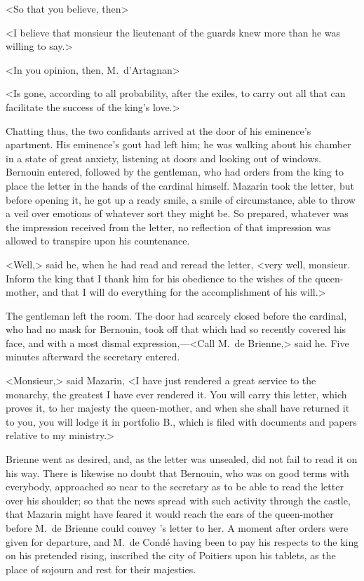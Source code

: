 <So that you believe, then\longdash>

<I believe that monsieur the lieutenant of the guards knew more than he was willing to say.>

<In you opinion, then, M.~d'Artagnan\longdash>

<Is gone, according to all probability, after the exiles, to carry out all that can facilitate the success of the king's love.>

Chatting thus, the two confidants arrived at the door of his eminence's apartment. His eminence's gout had left him; he was walking about his chamber in a state of great anxiety, listening at doors and looking out of windows. Bernouin entered, followed by the gentleman, who had orders from the king to place the letter in the hands of the cardinal himself. Mazarin took the letter, but before opening it, he got up a ready smile, a smile of circumstance, able to throw a veil over emotions of whatever sort they might be. So prepared, whatever was the impression received from the letter, no reflection of that impression was allowed to transpire upon his countenance.

<Well,> said he, when he had read and reread the letter, <very well, monsieur. Inform the king that I thank him for his obedience to the wishes of the queen-mother, and that I will do everything for the accomplishment of his will.>

The gentleman left the room. The door had scarcely closed before the cardinal, who had no mask for Bernouin, took off that which had so recently covered his face, and with a most dismal expression,—<Call M.~de Brienne,> said he. Five minutes afterward the secretary entered.

<Monsieur,> said Mazarin, <I have just rendered a great service to the monarchy, the greatest I have ever rendered it. You will carry this letter, which proves it, to her majesty the queen-mother, and when she shall have returned it to you, you will lodge it in portfolio B., which is filed with documents and papers relative to my ministry.>

Brienne went as desired, and, as the letter was unsealed, did not fail to read it on his way. There is likewise no doubt that Bernouin, who was on good terms with everybody, approached so near to the secretary as to be able to read the letter over his shoulder; so that the news spread with such activity through the castle, that Mazarin might have feared it would reach the ears of the queen-mother before M.~de Brienne could convey 's letter to her. A moment after orders were given for departure, and M.~de Condé having been to pay his respects to the king on his pretended rising, inscribed the city of Poitiers upon his tablets, as the place of sojourn and rest for their majesties.

